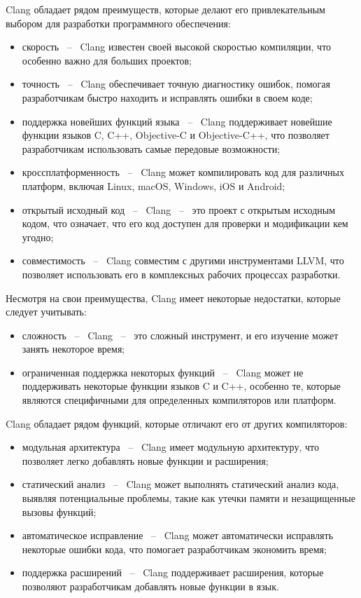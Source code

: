 Clang обладает рядом преимуществ, которые делают его привлекательным выбором для разработки программного обеспечения:

\begin{itemize}
    \item скорость ~--~ Clang известен своей высокой скоростью компиляции, что особенно важно для больших проектов;
    \item точность ~--~ Clang обеспечивает точную диагностику ошибок, помогая разработчикам быстро находить и исправлять ошибки в своем коде;
    \item поддержка новейших функций языка ~--~ Clang поддерживает новейшие функции языков C, C++, Objective-C и Objective-C++, что позволяет разработчикам использовать самые передовые возможности;
    \item кроссплатформенность ~--~ Clang может компилировать код для различных платформ, включая Linux, macOS, Windows, iOS и Android;
    \item открытый исходный код ~--~ Clang ~--~ это проект с открытым исходным кодом, что означает, что его код доступен для проверки и модификации кем угодно;
    \item совместимость ~--~ Clang совместим с другими инструментами LLVM, что позволяет использовать его в комплексных рабочих процессах разработки.
\end{itemize}

Несмотря на свои преимущества, Clang имеет некоторые недостатки, которые следует учитывать:
\begin{itemize}
    \item сложность ~--~ Clang ~--~ это сложный инструмент, и его изучение может занять некоторое время;
    \item ограниченная поддержка некоторых функций ~--~ Clang может не поддерживать некоторые функции языков C и C++, особенно те, которые являются специфичными для определенных компиляторов или платформ.
\end{itemize}

Clang обладает рядом функций, которые отличают его от других компиляторов:

\begin{itemize}
    \item модульная архитектура ~--~ Clang имеет модульную архитектуру, что позволяет легко добавлять новые функции и расширения;
    \item статический анализ ~--~ Clang может выполнять статический анализ кода, выявляя потенциальные проблемы, такие как утечки памяти и незащищенные вызовы функций;
    \item автоматическое исправление ~--~ Clang может автоматически исправлять некоторые ошибки кода, что помогает разработчикам экономить время;
    \item поддержка расширений ~--~ Clang поддерживает расширения, которые позволяют разработчикам добавлять новые функции в язык.
\end{itemize}

